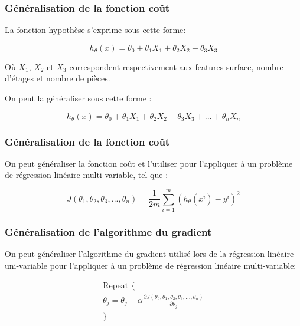 \subsubsection{Généralisation de la fonction coût}
\label{Le Machine Learning:Les différents algorithmes d'apprentissage supervisé: La regression linéaire multi-variable: Généralisation de l'hypothèse}
La fonction hypothèse s'exprime sous cette forme: 

\begin{equation}
	h_\theta(x) = \theta_0 + \theta_1X_1 + \theta_2X_2 + \theta_3X_3
\end{equation}

Où $X_1$, $X_2$ et $X_3$ correspondent respectivement aux features surface, nombre d'étages et nombre de pièces.

On peut la généraliser sous cette forme : 

\begin{equation}
h_\theta(x) = \theta_0 + \theta_1X_1 + \theta_2X_2 + \theta_3X_3 + ... + \theta_nX_n
\label{hypotesis multivar}
\end{equation}


\subsubsection{Généralisation de la fonction coût}
\label{Le Machine Learning:Les différents algorithmes d'apprentissage supervisé: La regression linéaire multi-variable: Généralisation de la fonction coût}
On peut généraliser la fonction coût et l'utiliser pour l'appliquer à un problème de régression linéaire multi-variable, tel que :

\begin{equation}
J(\theta_1,\theta_2,\theta_3,...,\theta_n) =  \frac{1}{2m}\sum_{i=1}^{m}(h_\theta(x^i)-y^{i})^2
\end{equation}


\subsubsection{Généralisation de l'algorithme du gradient}
\label{Le Machine Learning:Les différents algorithmes d'apprentissage supervisé: La regression linéaire multi-variable: Généralisation de l'algorithme du gradient}
On peut généraliser l'algorithme du gradient utilisé lors de la régression linéaire uni-variable pour l'appliquer à un problème de régression linéaire multi-variable:
 
\begin{equation}
\begin{split}
\text{Repeat \{} \\
\theta_j = \theta_j - \alpha \frac{\partial J(\theta_0, \theta_1, \theta_2, \theta_3, ... , \theta_n)}{\partial\theta_j} \\
\text{\}} \\
\end{split}
\end{equation}

